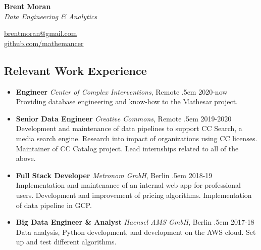 \documentclass[a4paper]{article}
\makeatletter
\newcommand \brentfill {
  \tiny
  \leavevmode \cleaders 
  \hb@xt@ .5em{\hss \textperiodcentered \hss }\hfill \kern \z@
  \normalsize
}
\newcommand{\bbull}{\ding{118}}
\makeatother
\begin{document}
\noindent
\begin{minipage}[b][1cm]{.7\textwidth}
  \Huge\textbf{Brent Moran} \\
  \normalsize\emph{Data Engineering \& Analytics}
\end{minipage}
\begin{minipage}[b][1cm]{.4\textwidth}
  \raggedleft
  \ttfamily
  \href{mailto:brentmoran@gmail.com}{brentmoran@gmail.com} \\
  \href{https://github.com/mathemancer}{github.com/mathemancer}
\end{minipage}

\subsection*{Relevant Work Experience \hrulefill}

\begin{itemize}
  \item[\bbull] \textbf{Engineer}
        \emph{Center of Complex Interventions}, Remote \brentfill{} 2020-now\\
    Providing database engineering and know-how to the Mathesar project.
  \item[\bbull] \textbf{Senior Data Engineer} \emph{Creative Commons},
    Remote \brentfill{} 2019-2020\\
    Development and maintenance of data pipelines to support CC Search, a media
    search engine.  Research into impact of organizations using CC licenses.
    Maintainer of CC Catalog project.  Lead internships related to all of the
    above.
  \item[\bbull] \textbf{Full Stack Developer} \emph{Metronom GmbH},
    Berlin \brentfill{} 2018-19\\
    Implementation and maintenance of an internal web app for professional
    users. Development and improvement of pricing algorithms. Implementation of
    data pipeline in GCP.
  \item[\bbull] \textbf{Big Data Engineer \& Analyst} \emph{Haensel AMS
    GmbH}, Berlin \brentfill{} 2017-18\\
    Data analysis, Python development, and development on the AWS cloud.
    Set up and test different algorithms.
\end{itemize}
\end{document}
